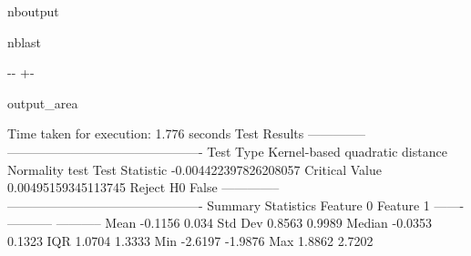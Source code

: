 \documentclass[letterpaper,10pt,english,openany,oneside]{sphinxmanual}
\begin{document}
\begin{sphinxuseclass}{nboutput}
\begin{sphinxuseclass}{nblast}
{

\kern-\sphinxverbatimsmallskipamount\kern-\baselineskip
\kern+\FrameHeightAdjust\kern-\fboxrule
\vspace{\nbsphinxcodecellspacing}

\begin{sphinxuseclass}{output_area}
\begin{sphinxuseclass}{}


\begin{sphinxVerbatim}[commandchars=\\\{\}]
Time taken for execution: 1.776 seconds
Test Results
--------------  ----------------------------------------------
Test Type       Kernel-based quadratic distance Normality test
Test Statistic  -0.004422397826208057
Critical Value  0.00495159345113745
Reject H0       False
--------------  ----------------------------------------------
Summary Statistics
           Feature 0    Feature 1
-------  -----------  -----------
Mean         -0.1156       0.034
Std Dev       0.8563       0.9989
Median       -0.0353       0.1323
IQR           1.0704       1.3333
Min          -2.6197      -1.9876
Max           1.8862       2.7202
\end{sphinxVerbatim}



\end{sphinxuseclass}
\end{sphinxuseclass}
}

\end{sphinxuseclass}
\end{sphinxuseclass}
\end{document}
